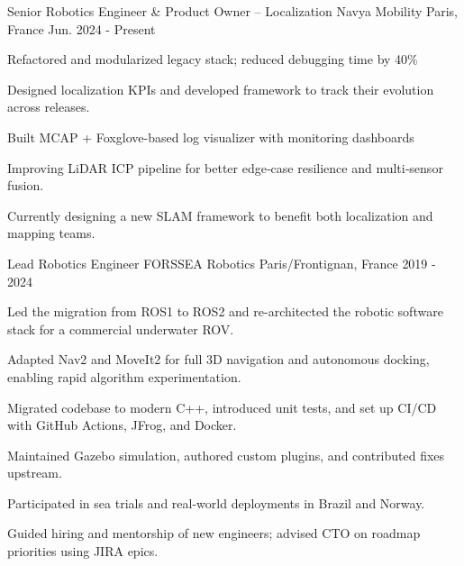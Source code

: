

\begin{cventries}

  \cventry
    {Senior Robotics Engineer \& Product Owner – Localization} %
    {Navya Mobility} %
    {Paris, France} %
    {Jun. 2024 - Present} %
    {
      \begin{cvitems} %
        \item Refactored and modularized legacy stack; reduced debugging time by 40\%
        \item Designed localization KPIs and developed framework to track their evolution across releases.
        \item Built MCAP + Foxglove-based log visualizer with monitoring dashboards
        \item Improving LiDAR ICP pipeline for better edge‑case resilience and multi‑sensor fusion.
        \item Currently designing a new SLAM framework to benefit both localization and mapping teams.
      \end{cvitems}
    }

  \cventry
    {Lead Robotics Engineer} %
    {FORSSEA Robotics} %
    {Paris/Frontignan, France} %
    {2019 - 2024} %
    {
      \begin{cvitems}
        \item Led the migration from ROS1 to ROS2 and re-architected the robotic software stack for a commercial underwater ROV.
        \item Adapted Nav2 and MoveIt2 for full 3D navigation and autonomous docking, enabling rapid algorithm experimentation.
        \item Migrated codebase to modern C++, introduced unit tests, and set up CI/CD with GitHub Actions, JFrog, and Docker.
        \item Maintained Gazebo simulation, authored custom plugins, and contributed fixes upstream.
        \item Participated in sea trials and real-world deployments in Brazil and Norway.
        \item Guided hiring and mentorship of new engineers; advised CTO on roadmap priorities using JIRA epics.
      \end{cvitems}
    }


\end{cventries}
